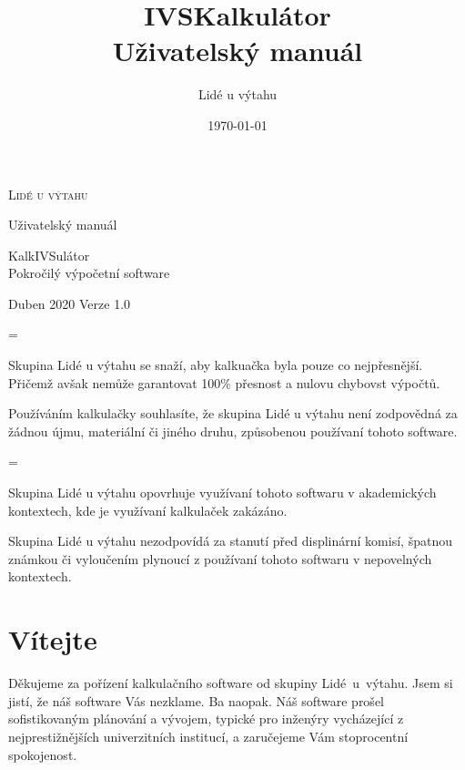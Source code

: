 \documentclass[a5paper,8pt,twoside]{extarticle}
\title{IVSKalkulátor\\Uživatelský manuál}
\author{Lidé u výtahu}
\date{\today}
\newenvironment{warningBox}
  {\par\begin{mdframed}[linewidth=1pt,linecolor=black]%
    \begin{list}{}{\leftmargin=1cm
                   \labelwidth=\leftmargin}\item[\Large\warning]}
  {\end{list}\end{mdframed}\par}
\newcommand*\joinBox{\vspace{-0.9em}}
\begin{document}
    \renewcommand\thesubsubsection{\Alph{subsubsection}}
    \setlength{\parindent}{0em}
    \setlength{\parskip}{1em}
    \begin{titlepage}
        \begin{center}
            {\LARGE \textsc{Lidé u výtahu}}

            {\large Uživatelský manuál}
            
            {\Huge KalkIVSulátor}\\
            \vspace{1.5mm}
            {\huge Pokročilý výpočetní software}\\
        \end{center}
        {\large Duben 2020} \hfill {\large Verze 1.0}
    \end{titlepage}
    
    \thispagestyle{empty}
    \begin{warningBox}
        Skupina Lidé u výtahu se snaží, aby kalkuačka byla pouze co nejpřesnější. Přičemž avšak nemůže garantovat 100\% přesnost a nulovu chybovst výpočtů.

        Používáním kalkulačky souhlasíte, že skupina Lidé u výtahu není zodpovědná za žádnou újmu, materiální či jiného druhu, způsobenou používaní tohoto software.
    \end{warningBox}
    \joinBox
    \begin{warningBox}
        Skupina Lidé u výtahu opovrhuje využívaní tohoto softwaru v akademických kontextech, kde je využívaní kalkulaček zakázáno.

        Skupina Lidé u výtahu nezodpovídá za stanutí před displinární komisí, špatnou známkou či vyloučením plynoucí z používaní tohoto softwaru v nepovelných kontextech.
    \end{warningBox}
    
    \newpage
    \setcounter{page}{1}
    \tableofcontents
    
    \newpage

    \section*{Vítejte}
    Děkujeme za pořízení kalkulačního software od skupiny Lidé~u~výtahu. Jsem si jistí, že náš software Vás nezklame. Ba naopak. Náš software prošel sofistikovaným plánování a vývojem, typické pro inženýry vycházející z nejprestižnějších univerzitních institucí, a zaručejeme Vám stoprocentní spokojenost.
\end{document}

